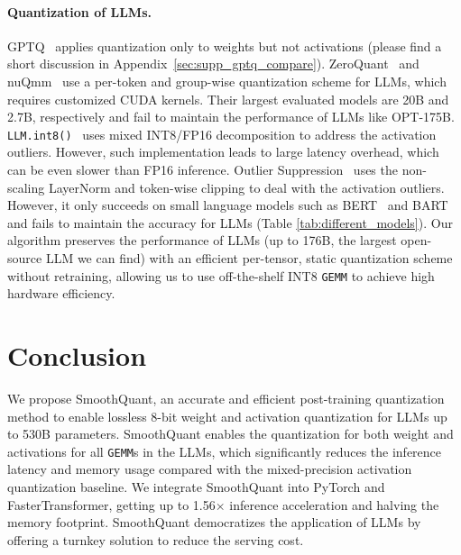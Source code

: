 \paragraph{Quantization of LLMs. } GPTQ~\cite{frantar2022gptq} applies quantization only to weights but not activations (please find a short discussion in Appendix~\ref{sec:supp_gptq_compare}).
ZeroQuant~\cite{zeroquant} and nuQmm~\cite{park2022nuqmm} use a per-token and group-wise quantization scheme for LLMs, which requires customized CUDA kernels. Their largest evaluated models are 20B and 2.7B, respectively and fail to maintain the performance of LLMs like OPT-175B.
\texttt{LLM.int8()}~\cite{dettmers2022llmint8} uses mixed INT8/FP16 decomposition to address the activation outliers. However, such implementation leads to large latency overhead, which can be even slower than FP16 inference. Outlier Suppression~\cite{outlier_suppression} uses the non-scaling LayerNorm and token-wise clipping to deal with the activation outliers. However, it only succeeds on small language models such as BERT~\cite{bert} and BART~\cite{lewis2019bart} and fails to  maintain the accuracy for LLMs (Table \ref{tab:different_models}).
Our algorithm preserves the performance of LLMs (up to 176B, the largest open-source LLM we can find) with an efficient per-tensor, static quantization scheme without retraining, allowing us to use off-the-shelf INT8 \texttt{GEMM} to achieve high hardware efficiency.

\section{Conclusion}
We propose SmoothQuant, an accurate and efficient post-training quantization method to enable lossless 8-bit weight and activation quantization for LLMs up to 530B parameters. SmoothQuant enables the quantization for both weight and activations for all \texttt{GEMM}s in the LLMs, which significantly reduces the inference latency and memory usage compared with the mixed-precision activation quantization baseline. We integrate SmoothQuant into PyTorch and FasterTransformer, getting up to 1.56$\times$ inference acceleration and halving the memory footprint. SmoothQuant democratizes the application of LLMs by offering a turnkey solution to reduce the serving cost. 


